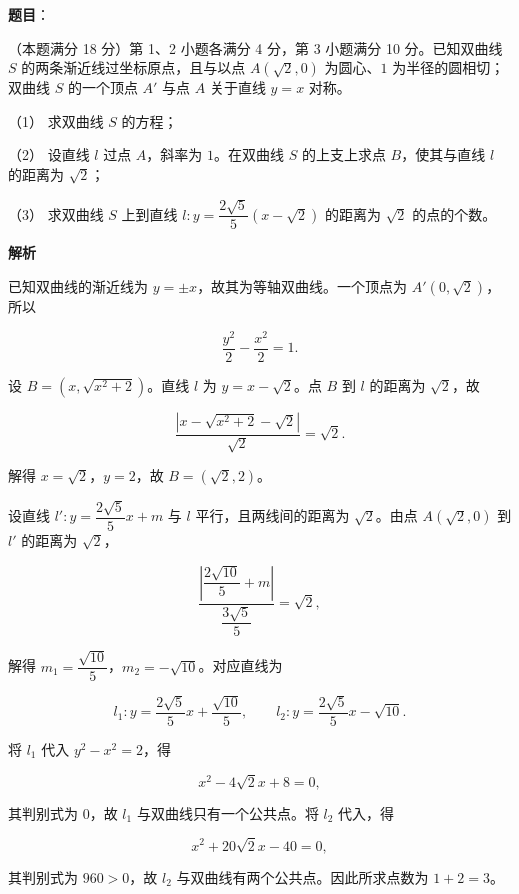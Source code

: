 \begin{answer}

\textbf{题目}：

（本题满分 18 分）第 1、2 小题各满分 4 分，第 3 小题满分 10 分。已知双曲线 $S$ 的两条渐近线过坐标原点，且与以点 $A(\sqrt2,0)$ 为圆心、$1$ 为半径的圆相切；双曲线 $S$ 的一个顶点 $A'$ 与点 $A$ 关于直线 $y=x$ 对称。

（1） 求双曲线 $S$ 的方程；

（2） 设直线 $l$ 过点 $A$，斜率为 $1$。在双曲线 $S$ 的上支上求点 $B$，使其与直线 $l$ 的距离为 $\sqrt2$；

（3） 求双曲线 $S$ 上到直线 $l:y=\dfrac{2\sqrt5}{5}(x-\sqrt2)$ 的距离为 $\sqrt2$ 的点的个数。
\nopagebreak[4]
\begin{center}\end{center}
\nopagebreak[4]
\textbf{解析}


已知双曲线的渐近线为 $y=\pm x$，故其为等轴双曲线。一个顶点为 $A'(0,\sqrt2)$，所以

\nopagebreak[4]
\[
\dfrac{y^2}{2}-\dfrac{x^2}{2}=1.
\]


设 $B=(x,\sqrt{x^2+2})$。直线 $l$ 为 $y=x-\sqrt2$。点 $B$ 到 $l$ 的距离为 $\sqrt2$，故

\nopagebreak[4]
\[
\dfrac{|x-\sqrt{x^2+2}-\sqrt2|}{\sqrt2}=\sqrt2.
\]

解得 $x=\sqrt2$，$y=2$，故 $B=(\sqrt2,2)$。


设直线 $l':y=\dfrac{2\sqrt5}{5}x+m$ 与 $l$ 平行，且两线间的距离为 $\sqrt2$。由点 $A(\sqrt2,0)$ 到 $l'$ 的距离为 $\sqrt2$，

\nopagebreak[4]
\[
\dfrac{|\dfrac{2\sqrt{10}}5+m|}{\dfrac{3\sqrt5}5}=\sqrt2,
\]

解得 $m_1=\dfrac{\sqrt{10}}5$，$m_2=-\sqrt{10}$。对应直线为

\nopagebreak[4]
\[
l_1:y=\dfrac{2\sqrt5}{5}x+\dfrac{\sqrt{10}}5,
\qquad l_2:y=\dfrac{2\sqrt5}{5}x-\sqrt{10}.
\]

将 $l_1$ 代入 $y^2-x^2=2$，得

\nopagebreak[4]
\[
x^2-4\sqrt2x+8=0,
\]

其判别式为 $0$，故 $l_1$ 与双曲线只有一个公共点。将 $l_2$ 代入，得

\nopagebreak[4]
\[
x^2+20\sqrt2x-40=0,
\]

其判别式为 $960>0$，故 $l_2$ 与双曲线有两个公共点。因此所求点数为 $1+2=3$。




\end{answer}

